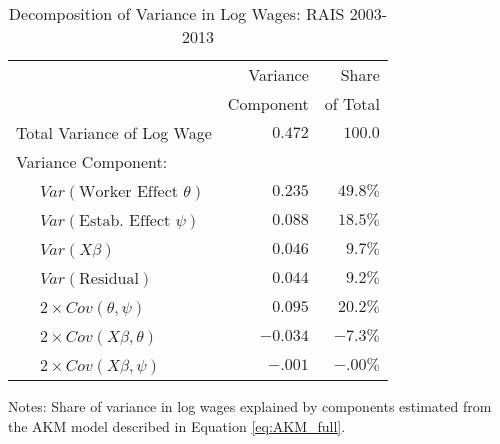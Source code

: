 
\begin{table}
  \label{tab:AKM_vardecomp}
  \small 
   \caption{Decomposition of Variance in Log Wages: RAIS 2003-2013}
   \begin{center}
      \begin{tabular}{lrr}
      \toprule            
              
                                       & Variance & Share \\
                                      &Component & of Total \\
\midrule
      Total Variance of Log Wage              & $ 0.472$   &    $100.0$             \\  
      Variance Component:                     &            &                 \\ 
      ~~~$Var(\text{Worker Effect~}\theta)$   & $ 0.235$   &   $ 49.8\% $     \\
      ~~~$Var(\text{Estab. Effect~} \psi)$    & $ 0.088$   &   $ 18.5\% $    \\
      ~~~$Var(X\beta)$                        & $ 0.046$   &   $ 9.7\% $    \\
      ~~~$Var(\text{Residual})$               & $0.044$    &   $ 9.2\% $    \\
      ~~~$2\times Cov(\theta,\psi)$           & $0.095$    &   $20.2\%$           \\
      ~~~$2\times Cov(X\beta,\theta)$         & $-0.034$   &   $-7.3\%$           \\
      ~~~$2\times Cov(X\beta,\psi)$           & $-.001$    &   $-.00\%$           \\
  \bottomrule
   \end{tabular}
   \end{center}
   \label{tab:AKM_vardecomp}
   \footnotesize{Notes: Share of variance in log wages explained by components estimated from the AKM model described in Equation \eqref{eq:AKM_full}.}
\end{table}       
